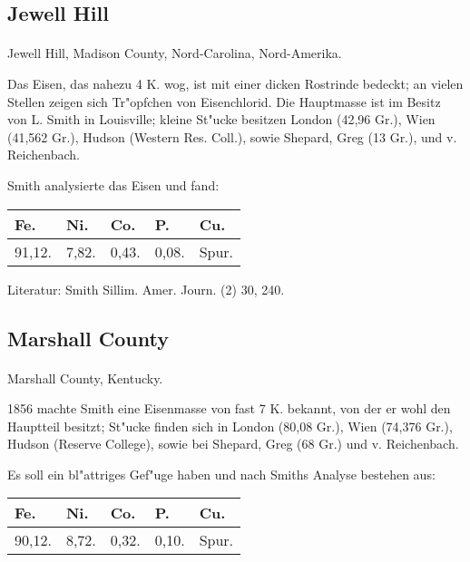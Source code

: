 \documentclass[a4paper, 11pt, oneside]{article}
\begin{document}
\subsection{Jewell Hill}
\normalsize
\paragraph{}
Jewell Hill, Madison County, Nord-Carolina, Nord-Amerika.

Das Eisen, das nahezu 4 K. wog, ist mit einer dicken Rostrinde bedeckt; an vielen Stellen zeigen sich Tr"opfchen von Eisenchlorid. Die Hauptmasse ist im Besitz von L. Smith in Louisville; kleine St"ucke besitzen London (42,96 Gr.), Wien (41,562 Gr.), Hudson (Western Res. Coll.), sowie Shepard, Greg (13 Gr.), und v. Reichenbach.

Smith analysierte das Eisen und fand:
\begin{table}[H]
    \centering
    \begin{tabular}{l l l l l}
        Fe. & Ni. & Co. & P. & Cu. \\ \hline
        91,12. & 7,82. & 0,43. & 0,08. & Spur. \\
    \end{tabular}
\end{table}

\footnotesize
Literatur: Smith Sillim. Amer. Journ. (2) 30, 240.

\subsection{Marshall County}
\normalsize
\paragraph{}
Marshall County, Kentucky.

1856 machte Smith eine Eisenmasse von fast 7 K. bekannt, von der er wohl den Hauptteil besitzt; St"ucke finden sich in London (80,08 Gr.), Wien (74,376 Gr.), Hudson (Reserve College), sowie bei Shepard, Greg (68 Gr.) und v. Reichenbach.

Es soll ein bl"attriges Gef"uge haben und nach Smiths Analyse bestehen aus:
\begin{table}[H]
    \centering
    \begin{tabular}{l l l l l}
        Fe. & Ni. & Co. & P. & Cu. \\ \hline
        90,12. & 8,72. & 0,32. & 0,10. & Spur. \\
    \end{tabular}
\end{table}
\end{document}
